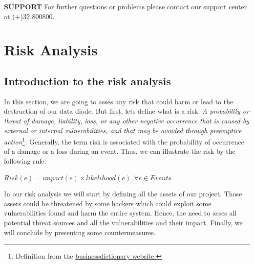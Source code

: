 \documentclass[a4paper,10pt]{article}
\begin{document}
\underline{\textbf{SUPPORT}} For further questions or problems please contact our support center at (+)32 800800.
\newpage
\section{Risk Analysis}

\subsection{Introduction to the risk analysis}
In this section, we are going to asses any risk that could harm or lead to the destruction of our data diode. But first, lets define what is a risk: \emph{A probability or threat of damage, liability, loss, or any other negative occurrence that is caused by external or internal vulnerabilities, and that may be avoided through preemptive action}\footnote{Definition from the \href{http://www.businessdictionary.com/definition/risk.html}{businessdictionary website.}}. Generally, the term risk is associated with the probability of occurrence of a damage or a loss during an event. Thus, we can illustrate the risk by the following rule:
\begin{center}
\centering
$Risk(e)= impact(e) \times likelihood(e), \forall e \in Events$
\end{center}

In our risk analysis we will start by defining all the assets of our project. Those assets could be threatened by some hackers which could exploit some vulnerabilities found and harm the entire system. Hence, the need to asses all potential threat sources and all the vulnerabilities and their impact. Finally, we will conclude by presenting some countermeasures.
\end{document}
